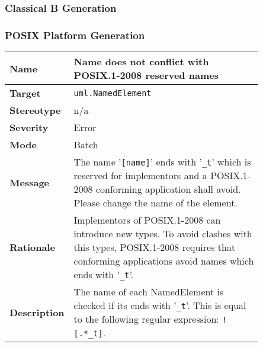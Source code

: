 \documentclass{template/openetcs_article}
\begin{document}
\subsubsection{Classical B Generation}

\subsubsection{POSIX Platform Generation}

\begin{longtable}{|l||>{\raggedright}p{0.85\linewidth}|}
  \hline
  \textbf{Name}        &  Name does not conflict with POSIX.1-2008 reserved names \tabularnewline \hline
  \textbf{Target}      &  \texttt{uml.NamedElement} \tabularnewline \hline
  \textbf{Stereotype}  &  n/a \tabularnewline \hline
  \textbf{Severity}    &  Error \tabularnewline \hline
  \textbf{Mode}        &  Batch \tabularnewline \hline
  \textbf{Message}     &  The name '\texttt{[name]}' ends with '\texttt{\_t}' which is reserved for
                          implementors and a POSIX.1-2008 conforming application shall avoid. 
                          Please change the name of the element. \tabularnewline \hline
  \textbf{Rationale}   &  Implementors of POSIX.1-2008 can introduce new types. To avoid clashes with this types,
                          POSIX.1-2008 requires that conforming applications avoid names which 
                          ends with '\texttt{\_t}'. \tabularnewline \hline
  \textbf{Description} &  The name of each NamedElement is checked if its ends with '\texttt{\_t}'. This is equal to 
                          the following regular expression: \texttt{![.*\_t]}. \tabularnewline \hline
\end{longtable}



% 
% 

\end{document}
